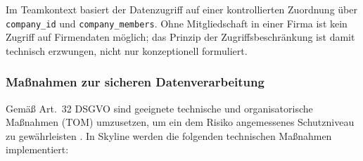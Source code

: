 Im Teamkontext basiert der Datenzugriff auf einer kontrollierten
Zuordnung über \texttt{company\_id} und \texttt{company\_members}.
Ohne Mitgliedschaft in einer Firma ist kein Zugriff auf Firmendaten
möglich; das Prinzip der Zugriffsbeschränkung ist damit technisch
erzwungen, nicht nur konzeptionell formuliert.

\subsubsection{Maßnahmen zur sicheren Datenverarbeitung}

Gemäß Art.~32 DSGVO sind geeignete technische und organisatorische
Maßnahmen (TOM) umzusetzen, um ein dem Risiko angemessenes Schutzniveau
zu gewährleisten \cite{edpbArt32}.
In Skyline werden die folgenden technischen Maßnahmen implementiert:

